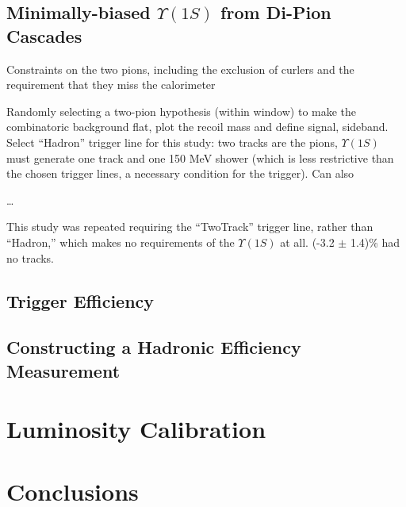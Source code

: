 \documentclass[aps,prd,preprint,superscriptaddress,tightenlines,nofootinbib,floatfix]{revtex4}
\begin{document}
\subsection{Minimally-biased $\Upsilon(1S)$ from Di-Pion Cascades}
%

Constraints on the two pions, including the exclusion of curlers and
the requirement that they miss the calorimeter

Randomly selecting a two-pion hypothesis (within window) to make the
combinatoric background flat, plot the recoil mass and define signal,
sideband.  Select ``Hadron'' trigger line for this study: two tracks
are the pions, $\Upsilon(1S)$ must generate one track and one 150 MeV
shower (which is less restrictive than the chosen trigger lines, a
necessary condition for the trigger).  Can also 


\ldots


This study was repeated requiring the ``TwoTrack'' trigger line,
rather than ``Hadron,'' which makes no requirements of the
$\Upsilon(1S)$ at all.  (-3.2 $\pm$ 1.4)\% had no tracks.

%
\subsection{Trigger Efficiency}
%

%
\subsection{Constructing a Hadronic Efficiency Measurement}
%


%
\section{Luminosity Calibration}
%

%
\section{Conclusions}
%
\end{document}
